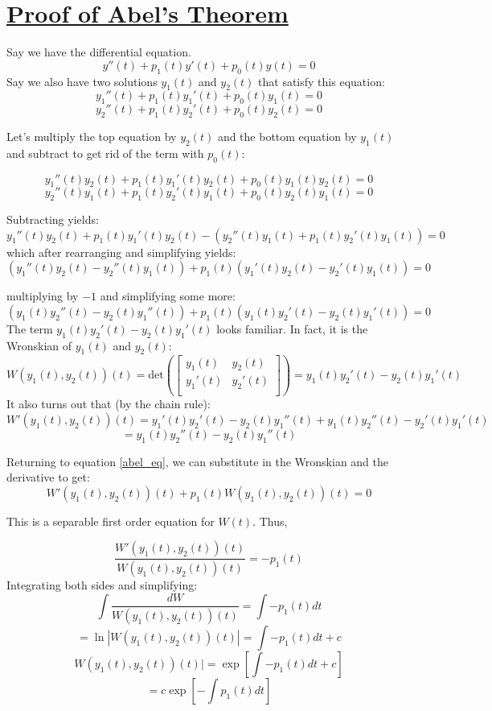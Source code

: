 \documentclass{report}
\begin{document}
\section{\hyperref[th:abel_thm]{Proof of Abel's Theorem}}
\label{sec:abel}
Say we have the differential equation.
$$y''(t) + p_1(t)y'(t) + p_0(t)y(t) = 0$$
Say we also have two solutions $y_1(t)$ and $y_2(t)$ that satisfy this equation:
$$y_1''(t) + p_1(t)y_1'(t) + p_0(t)y_1(t) = 0$$
$$y_2''(t) + p_1(t)y_2'(t) + p_0(t)y_2(t) = 0$$

Let's multiply the top equation by $y_2(t)$ and the bottom equation by $y_1(t)$ and subtract to get rid of the term with $p_0(t)$:

$$y_1''(t)y_2(t) + p_1(t)y_1'(t)y_2(t) + p_0(t)y_1(t)y_2(t) = 0$$
$$y_2''(t)y_1(t) + p_1(t)y_2'(t)y_1(t) + p_0(t)y_2(t)y_1(t) = 0$$

Subtracting yields:
$$y_1''(t)y_2(t) + p_1(t)y_1'(t)y_2(t) - (y_2''(t)y_1(t) + p_1(t)y_2'(t)y_1(t)) = 0$$
which after rearranging and simplifying yields:
\begin{equation}
\label{abel_eq}
(y_1''(t)y_2(t)-y_2''(t)y_1(t))+p_1(t)(y_1'(t)y_2(t)-y_2'(t)y_1(t)) = 0
\end{equation}

multiplying by $-1$ and simplifying some more:
$$(y_1(t)y_2''(t)-y_2(t)y_1''(t))+p_1(t)(y_1(t)y_2'(t)-y_2(t)y_1'(t)) = 0$$
The term $y_1(t)y_2'(t)-y_2(t)y_1'(t)$ looks familiar. In fact, it is the Wronskian of $y_1(t)$ and $y_2(t)$:
$$
    W(y_1(t), y_2(t))(t) =
    \text{det}\left(\begin{bmatrix}
        y_1(t) & y_2(t) \\
        y_1'(t) & y_2'(t) \\
        \end{bmatrix}\right)
    = y_1(t)y_2'(t)-y_2(t)y_1'(t)
$$
It also turns out that (by the chain rule):
$$
W'(y_1(t), y_2(t))(t) = y_1'(t)y_2'(t)-y_2(t)y_1''(t)+y_1(t)y_2''(t)-y_2'(t)y_1'(t)
$$
$$=y_1(t)y_2''(t)-y_2(t)y_1''(t)$$

Returning to equation \ref{abel_eq}, we can substitute in the Wronskian and the derivative to get:
$$W'(y_1(t),y_2(t))(t) + p_1(t)W(y_1(t), y_2(t))(t) = 0$$

This is a separable first order equation for $W(t)$. Thus,

$$\frac{W'(y_1(t),y_2(t))(t)}{W(y_1(t), y_2(t))(t)} = -p_1(t)$$
Integrating both sides and simplifying:
$$\int{\frac{dW}{W(y_1(t), y_2(t))(t)} }= \int{-p_1(t)dt}$$
$$=\ln|W(y_1(t), y_2(t))(t)| = \int{-p_1(t)dt} + c$$
$$W(y_1(t), y_2(t))(t)| = \exp{\left[\int{-p_1(t)dt} + c\right]}$$
$$=c\exp{\left[-\int{p_1(t)dt}\right]}$$
\end{document}
